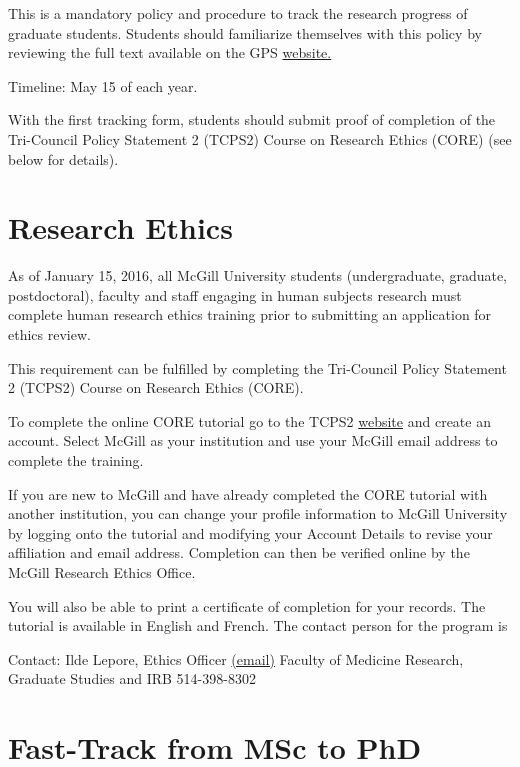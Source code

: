\documentclass[
  openany]{book}
\begin{document}
This is a mandatory policy and procedure to track the research progress of graduate students. Students should familiarize themselves with this policy by reviewing the full text available on the GPS \href{https://www.mcgill.ca/gps/students/progress-tracking}{website.}

Timeline: May 15 of each year.

With the first tracking form, students should submit proof of completion of the Tri-Council Policy Statement 2 (TCPS2) Course on Research Ethics (CORE) (see below for details).

\hypertarget{research-ethics}{%
\section{Research Ethics}\label{research-ethics}}

As of January 15, 2016, all McGill University students (undergraduate, graduate, postdoctoral), faculty and staff engaging in human subjects research must complete human research ethics training prior to submitting an application for ethics review.

This requirement can be fulfilled by completing the Tri-Council Policy Statement 2 (TCPS2) Course on Research Ethics (CORE).

To complete the online CORE tutorial go to the TCPS2 \href{http://tcps2core.ca/welcome}{website} and create an account. Select McGill as your institution and use your McGill email address to complete the training.

If you are new to McGill and have already completed the CORE tutorial with another institution, you can change your profile information to McGill University by logging onto the tutorial and modifying your Account Details to revise your affiliation and email address. Completion can then be verified online by the McGill Research Ethics Office.

You will also be able to print a certificate of completion for your records. The tutorial is available in English and French. The contact person for the program is

Contact:
Ilde Lepore, Ethics Officer \href{mailto:ilde.lepore@mcgill.ca}{(email)}
Faculty of Medicine Research, Graduate Studies and IRB
514-398-8302

\hypertarget{fast-track-from-msc-to-phd}{%
\section{Fast-Track from MSc to PhD}\label{fast-track-from-msc-to-phd}}
\end{document}
